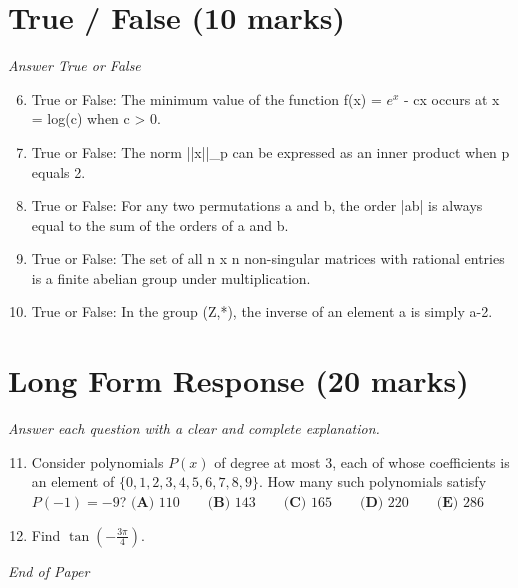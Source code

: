 \documentclass[12pt]{article}
\begin{document}
\section*{True / False (10 marks)}
\textit{Answer True or False}
\begin{enumerate}[label=\arabic*.]
\setcounter{enumi}{5}
\item True or False: The minimum value of the function f(x) = $e^x$ - cx occurs at x = log(c) when c \textgreater{} 0.
\item True or False: The norm ||x||\_p can be expressed as an inner product when p equals 2.
\item True or False: For any two permutations a and b, the order |ab| is always equal to the sum of the orders of a and b.
\item True or False: The set of all n x n non-singular matrices with rational entries is a finite abelian group under multiplication.
\item True or False: In the group (Z,*), the inverse of an element a is simply a-2.
\end{enumerate}

\section*{Long Form Response (20 marks)}
\textit{Answer each question with a clear and complete explanation.}
\begin{enumerate}[label=\arabic*.]
\setcounter{enumi}{10}
\item Consider polynomials $P(x)$ of degree at most $3$, each of whose coefficients is an element of $\{0, 1, 2, 3, 4, 5, 6, 7, 8, 9\}$. How many such polynomials satisfy $P(-1) = -9$? $\textbf{(A) } 110 \qquad \textbf{(B) } 143 \qquad \textbf{(C) } 165 \qquad \textbf{(D) } 220 \qquad \textbf{(E) } 286$
\item Find $\tan \left( -\frac{3 \pi}{4} \right).$
\end{enumerate}

\vfill
\noindent\textit{End of Paper}
\end{document}
